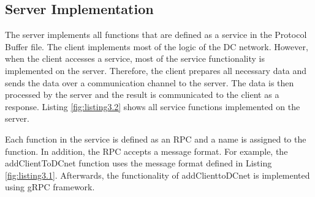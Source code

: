 \subsection{Server Implementation}
The server implements all functions that are defined as a service in the Protocol Buffer file. The client implements most of the logic of the DC network. However, when the client accesses a service, most of the service functionality is implemented on the server. Therefore, the client prepares all necessary data and sends the data over a communication channel to the server. The data is then processed by the server and the result is communicated to the client as a response. Listing \ref{fig:listing3.2} shows all service functions implemented on the server. %
\begin{nobreak} 
Each function in the service is defined as an \gls{RPC} and a name is assigned to the function. In addition, the \gls{RPC} accepts a message format. For example, the addClientToDCnet function uses the message format defined in Listing \ref{fig:listing3.1}. Afterwards, the functionality of addClienttoDCnet is implemented using gRPC framework.
\end{nobreak}
\clearpage
\\


\\ %
